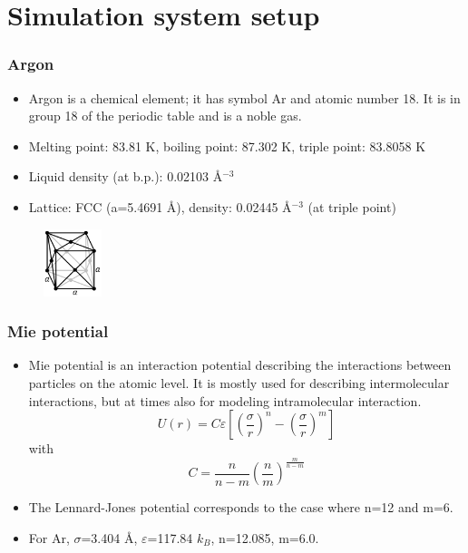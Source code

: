 \documentclass[10pt,t]{beamer}
\begin{document}
\section{Simulation system setup}
\begin{frame}
    \frametitle{Argon}
    \begin{itemize}
    \vspace{-0.6em}
    \setlength\itemsep{1em}
        \item Argon is a chemical element; it has symbol Ar and atomic number 18. It is in group 18 of the periodic table and is a noble gas.       
        \item Melting point: 83.81 K, boiling point: 87.302 K, triple point: 83.8058 K
        \item Liquid density (at b.p.): 0.02103 \AA$^{-3}$
        \item Lattice: FCC (a=5.4691 \AA), density: 0.02445 \AA$^{-3}$ (at triple point)
    \end{itemize}
    \begin{figure} %
        \centering
        \includegraphics[width=0.15\textwidth]{figures/Cubic-face-centered.png} 
    \end{figure}
\end{frame}

\begin{frame}
\frametitle{Mie potential}
\begin{itemize}
\vspace{-0.6em}
\setlength\itemsep{1em}
    \item Mie potential is an interaction potential describing the interactions between particles on the atomic level. It is mostly used for describing intermolecular interactions, but at times also for modeling intramolecular interaction.
    \begin{equation*}
        U(r) = C \varepsilon \left[\left(\frac{\sigma}{r}\right)^n-\left(\frac{\sigma}{r}\right)^m\right]
    \end{equation*}
    with
    \begin{equation*}
        C = \frac{n}{n-m}\left(\frac{n}{m}\right)^{\frac{m}{n-m}}
    \end{equation*}
    \item The Lennard-Jones potential corresponds to the case where n=12 and m=6.
    \item For Ar, $\sigma$=3.404 \AA, $\varepsilon$=117.84 $k_B$, n=12.085, m=6.0.
\end{itemize}
\end{frame}
\end{document}
